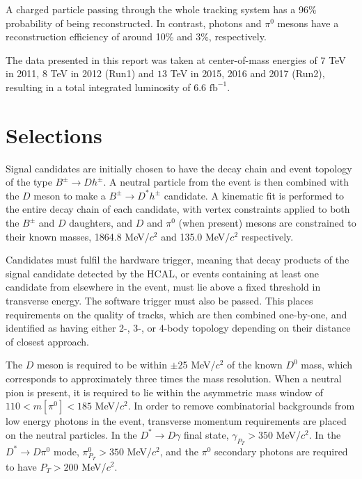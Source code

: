 \documentclass[oneside,12pt]{article}
\begin{document}
A charged particle passing through the whole tracking system has a 96\%
probability of being reconstructed. In contrast, photons and $\pi^0$ mesons have a
reconstruction efficiency of around 10\% and 3\%, respectively.

The data presented in this report was taken at center-of-mass energies of $7$
TeV in 2011, $8$ TeV in 2012 (Run1) and $13$ TeV in 2015, 2016 and 2017 (Run2),
resulting in a total integrated luminosity of $6.6$ $\text{fb}^{-1}$.

\section{Selections} \label{selections}

Signal candidates are initially chosen to have the decay chain and event
topology of the type $B^{\pm}\rightarrow Dh^{\pm}$. A neutral particle from the
event is then combined with the $D$ meson to make a $B^{\pm}\rightarrow
D^*h^{\pm}$ candidate. A kinematic fit is performed to the entire decay chain
of each candidate, with vertex constraints applied to both the $B^{\pm}$ and $D$
daughters, and $D$ and $\pi^0$ (when present) mesons are constrained to their
known masses, 1864.8 MeV/$c^2$ and 135.0 MeV/$c^2$ respectively.

Candidates must fulfil the hardware trigger, meaning that decay products of the
signal candidate detected by the HCAL, or events containing at least one
candidate from elsewhere in the event, must lie above a fixed threshold in
transverse energy.  The software trigger must also be passed. This places
requirements on the quality of tracks, which are then combined one-by-one, and
identified as having either 2-, 3-, or 4-body topology depending on their
distance of closest approach. 

The $D$ meson is required to be within $\pm$25 MeV/$c^2$ of the known $D^0$
mass, which corresponds to approximately three times the mass resolution.  When
a neutral pion is present, it is required to lie within the asymmetric mass
window of $110 < m[\pi^0] < 185$ MeV/$c^2$. In order to remove combinatorial
backgrounds from low energy photons in the event, transverse momentum
requirements are placed on the neutral particles. In the $D^*\rightarrow
D\gamma$ final state, $\gamma_{P_T}>350$ MeV/$c^2$. In the $D^*\rightarrow
D\pi^0$ mode, $\pi^0_{P_T}>350$ MeV/$c^2$, and the $\pi^0$ secondary photons are
required to have $P_T>200$ MeV/$c^2$.
\end{document}
